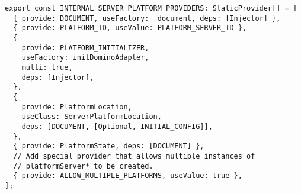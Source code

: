 \begin{verbatim}
export const INTERNAL_SERVER_PLATFORM_PROVIDERS: StaticProvider[] = [
  { provide: DOCUMENT, useFactory: _document, deps: [Injector] },
  { provide: PLATFORM_ID, useValue: PLATFORM_SERVER_ID },
  {
    provide: PLATFORM_INITIALIZER,
    useFactory: initDominoAdapter,
    multi: true,
    deps: [Injector],
  },
  {
    provide: PlatformLocation,
    useClass: ServerPlatformLocation,
    deps: [DOCUMENT, [Optional, INITIAL_CONFIG]],
  },
  { provide: PlatformState, deps: [DOCUMENT] },
  // Add special provider that allows multiple instances of
  // platformServer* to be created.
  { provide: ALLOW_MULTIPLE_PLATFORMS, useValue: true },
];
\end{verbatim}
